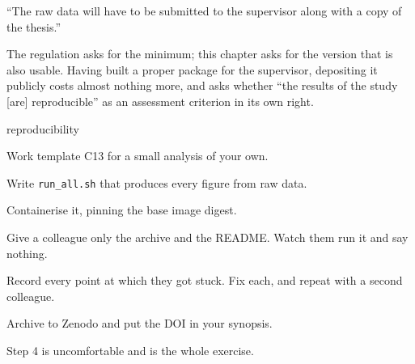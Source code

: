 \begin{regbox}
``The raw data will have to be submitted to the supervisor along with a copy of
the thesis.''

\medskip
The regulation asks for the minimum; this chapter asks for the version that is
also usable. Having built a proper package for the supervisor, depositing it
publicly costs almost nothing more, and  asks
whether ``the results of the study [are] reproducible'' as an assessment
criterion in its own right.
\end{regbox}

\begin{traditions}{reproducibility}
\end{traditions}

\begin{lab}
\begin{tightnum}
  \item Work template C13 for a small analysis of your own.
  \item Write \texttt{run\_all.sh} that produces every figure from raw data.
  \item Containerise it, pinning the base image digest.
  \item Give a colleague only the archive and the README. Watch them run it and
    say nothing.
  \item Record every point at which they got stuck. Fix each, and repeat with a
    second colleague.
  \item Archive to Zenodo and put the DOI in your synopsis.
\end{tightnum}

\medskip
Step 4 is uncomfortable and is the whole exercise.
\end{lab}

